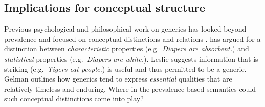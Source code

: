 \documentclass[12pt,letterpaper]{article}
\newcommand{\mht}[1]{\textcolor{Blue}{[mht: #1]}}
\begin{document}








\subsection*{Implications for conceptual structure}


Previous psychological and philosophical work on generics has looked beyond prevalence and focused on conceptual distinctions and relations \cite{Gelman2003,Prasada2013,Leslie2007,Leslie2008}. 
\citeauthor{Prasada2013} has argued for a distinction between \emph{characteristic} properties (e.g.~\emph{Diapers are absorbent.}) and \emph{statistical} properties (e.g.~\emph{Diapers are white.}).
Leslie suggests information that is striking (e.g.~\emph{Tigers eat people.}) is useful and thus permitted to be a generic.
Gelman outlines how generics tend to express \emph{essential} qualities that are relatively timeless and enduring. 
Where in the prevalence-based semantics could such conceptual distinctions come into play?
\end{document}
